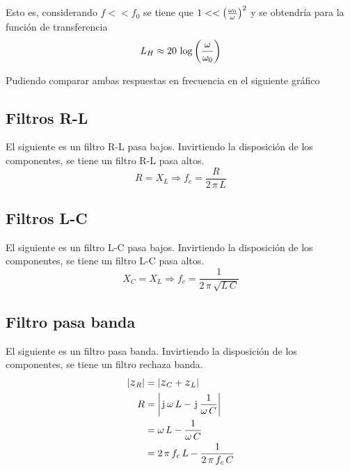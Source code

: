 Esto es, considerando $f << f_0$ se tiene que $1 << \left(\tfrac{\omega_0}{\omega}\right)^2$ y se obtendría para la función de transferencia
\begin{equation*}
    L_H \approx 20 \, \log \left(\frac{\omega}{\omega_0}\right)
\end{equation*}

Pudiendo comparar ambas respuestas en frecuencia en el siguiente gráfico

\begin{center}
    \def\svgwidth{\linewidth}
    
\end{center}


\subsection{Filtros R-L}

El siguiente es un filtro R-L pasa bajos.
Invirtiendo la disposición de los componentes, se tiene un filtro R-L pasa altos.
\begin{equation*}
    R = X_L \Rightarrow f_c = \frac{R}{2 \, \pi \, L}
\end{equation*}

\begin{center}
    \def\svgwidth{0.6\linewidth}
    
\end{center}


\subsection{Filtros L-C}

El siguiente es un filtro L-C pasa bajos.
Invirtiendo la disposición de los componentes, se tiene un filtro L-C pasa altos.
\begin{equation*}
    X_C = X_L \Rightarrow f_c = \dfrac{1}{2 \, \pi \, \sqrt{L \, C}}
\end{equation*}

\begin{center}
    \def\svgwidth{0.6\linewidth}
    
\end{center}


\subsection{Filtro pasa banda}

El siguiente es un filtro pasa banda.
Invirtiendo la disposición de los componentes, se tiene un filtro rechaza banda.
\begin{align*}
    \norm{\impedance_R} &= \norm{\impedance_C + \impedance_L}
    \\
    R &= \norm{\iu \, \omega \, L - \iu \, \frac{1}{\omega \, C}}
    \\
    &= \omega \, L - \frac{1}{\omega \, C}
    \\
    &= 2 \, \pi \, f_c \, L - \frac{1}{2 \, \pi \, f_c \, C}
\end{align*}

